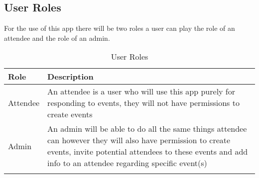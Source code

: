 
\subsection{User Roles}

For the use of this app there will be two roles a user can play the role of an attendee and the role of an admin.

\begin{longtable}{ |p{4cm}|p{10cm}|  }
		\hline
		\hline
		\textbf{Role} & \textbf{Description} \\
		\hline
		Attendee & An attendee is a user who will use this app purely for responding to events, they will not have permissions to create events\\
		\hline
		Admin & An admin will be able to do all the same things attendee can however they will also have permission to create events, invite potential attendees to these events and add info to an attendee regarding specific event(s)\\
		\hline
    \caption{User Roles}
	\label{table:userroles}
\end{longtable}


